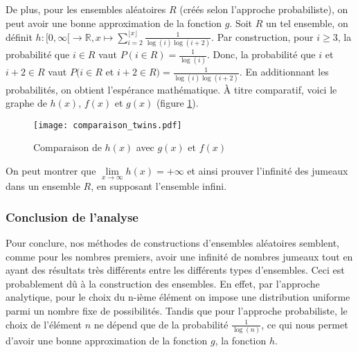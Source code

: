 \documentclass[../main.tex]{subfiles}
\begin{document}
	De plus, pour les ensembles aléatoires $R$ (créés selon l'approche probabiliste), on peut avoir une bonne approximation de la fonction $g$. Soit $R$ un tel ensemble, on définit $ h : [0, \infty[ \rightarrow \mathbb{R}, x \mapsto \sum_{i = 2}^{\lfloor x \rfloor}  \frac{1}{\log(i) \log(i+2)}$. Par construction, pour $i \geqslant 3$, la probabilité que $i \in R$ vaut $P(i \in R) = \frac{1}{\log(i)}$. Donc, la probabilité que $i$ et $i+2 \in R$ vaut $ P(i \in R $ et $i+2 \in R) = \frac{1}{\log(i)\log(i+2)}$. En additionnant les probabilités, on obtient l'espérance mathématique. À titre comparatif, voici le graphe de $h(x)$, $f(x)$ et $g(x)$ (figure \ref{im:image7}).
\begin{figure}[H]
 \centering
 \texttt{[image: comparaison\_twins.pdf]}
 \caption{Comparaison de $h(x)$ avec $g(x)$ et $f(x)$}
 \label{im:image7}
 \end{figure}
On peut montrer que $\lim\limits_{x \rightarrow \infty} h(x) = + \infty$ et ainsi prouver l'infinité des jumeaux dans un ensemble $R$, en supposant l'ensemble infini. 

\subsubsection{Conclusion de l'analyse}
Pour conclure, nos méthodes de constructions d'ensembles aléatoires semblent, comme pour les nombres premiers, avoir une infinité de nombres jumeaux tout en ayant des résultats très différents entre les différents types d'ensembles. Ceci est probablement dû à la construction des ensembles. En effet, par l'approche analytique, pour le choix du n-ième élément on impose une distribution uniforme parmi un nombre fixe de possibilités. Tandis que pour l'approche probabiliste, le choix de l'élément $n$ ne dépend que de la probabilité $\frac{1}{\log(n)}$, ce qui nous permet d'avoir une bonne approximation de la fonction $g$, la fonction $h$. 

\clearpage
\end{document}
